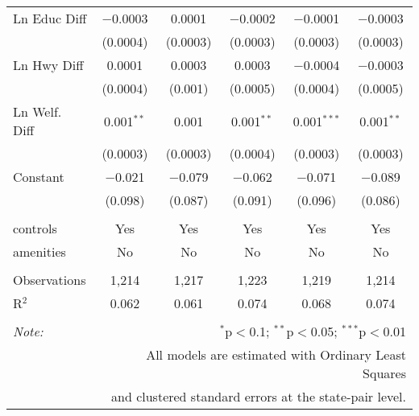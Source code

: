 \begin{table}[!htbp]
\begin{tabular}{@{\extracolsep{5pt}}lccccc}
  Ln Educ Diff & $-$0.0003 & 0.0001 & $-$0.0002 & $-$0.0001 & $-$0.0003 \\ 
  & (0.0004) & (0.0003) & (0.0003) & (0.0003) & (0.0003) \\ 
  Ln Hwy Diff & 0.0001 & 0.0003 & 0.0003 & $-$0.0004 & $-$0.0003 \\ 
  & (0.0004) & (0.001) & (0.0005) & (0.0004) & (0.0005) \\ 
  Ln Welf. Diff & 0.001$^{**}$ & 0.001 & 0.001$^{**}$ & 0.001$^{***}$ & 0.001$^{**}$ \\ 
  & (0.0003) & (0.0003) & (0.0004) & (0.0003) & (0.0003) \\ 
  Constant & $-$0.021 & $-$0.079 & $-$0.062 & $-$0.071 & $-$0.089 \\ 
  & (0.098) & (0.087) & (0.091) & (0.096) & (0.086) \\ 
 \hline \\[-1.8ex] 
controls & Yes & Yes & Yes & Yes & Yes \\ 
amenities & No & No & No & No & No \\ 
\hline \\[-1.8ex] 
Observations & 1,214 & 1,217 & 1,223 & 1,219 & 1,214 \\ 
R$^{2}$ & 0.062 & 0.061 & 0.074 & 0.068 & 0.074 \\ 
\hline 
\hline \\[-1.8ex] 
\textit{Note:}  & \multicolumn{5}{r}{$^{*}$p$<$0.1; $^{**}$p$<$0.05; $^{***}$p$<$0.01} \\ 
 & \multicolumn{5}{r}{All models are estimated with Ordinary Least Squares} \\ 
 & \multicolumn{5}{r}{and clustered standard errors at the state-pair level.} \\ 
\end{tabular} 
\end{table} 
